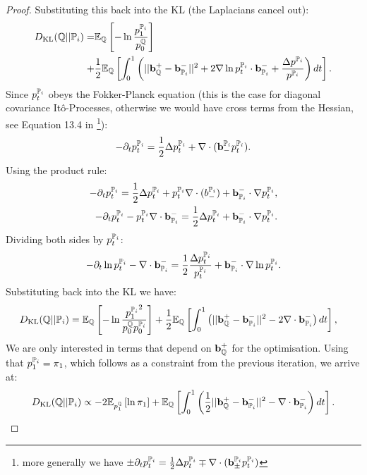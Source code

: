 \documentclass[a4paper,12pt,twoside,openright]{report}
\theoremstyle{definition}
\begin{document}
\begin{proof}
Substituting this back into the KL (the Laplacians cancel out):
\begin{align*}
\KL(\Q||{\P_{i}}) = &\E_\Q\left[-\log \frac{ p^{\P_{i}}_1}{ p^\Q_0}\right] \\+ &\frac{1}{2}\E_{\Q}\left[\int_0^1 \left(|| \rvb_\Q^{+} - \rvb_{\P_{i}}^{-}||^2 + 2\nabla\log p_t^{\P_{i}} \cdot \rvb_{\P_{i}}^{-}+ \frac{\Delta  p^{\P_{i}}}{ p^{\P_{i}}}\right)dt\right].
\end{align*}
Since $ p_t^{\P_{i}}$ obeys the Fokker-Planck equation (this is the case for diagonal covariance Itô-Processes, otherwise we would have cross terms from the Hessian, see Equation 13.4 in \cite{nelson1967dynamical}\footnote{more generally we have $\pm\partial_t p_t^{\P_{i}} = \frac{1}{2}\Delta p_t^{\P_{i}}\mp\nabla\cdot(\rvb_\pm^{\P_{i}} p_t^{\P_{i}})$}): 
\begin{align*}
-\partial_t p_t^{\P_{i}} = \frac{1}{2}\Delta p_t^{\P_{i}}+\nabla\cdot(\rvb_{-}^{\P_{i}} p_t^{\P_{i}}).
\end{align*}
Using the product rule: 
\begin{align*}
-\partial_t p_t^{\P_{i}} = \frac{1}{2}\Delta p_t^{\P_{i}}+  p_t^{\P_{i}} \nabla\cdot(b_{-}^{\P_{i}}) + \rvb^{-}_{\P_{i}} \cdot \nabla p_t^{\P_{i}}, \\
-\partial_t p_t^{\P_{i}} -  p_t^{\P_{i}} \nabla\cdot \rvb^{-}_{\P_{i}}  = \frac{1}{2}\Delta p_t^{\P_{i}}+ \rvb^{-}_{\P_{i}} \cdot\nabla  p_t^{\P_{i}}.
\end{align*}
Dividing both sides by $ p_t^{\P_{i}}$:
\begin{align*}
-\partial_t \log  p_t^{\P_{i}} - \nabla\cdot \rvb^{-}_{\P_{i}}  = \frac{1}{2}\frac{\Delta  p_t^{\P_{i}}}{ p_t^{\P_{i}}}+  \rvb^{-}_{\P_{i}} \cdot \nabla \log  p_t^{\P_{i}}.
\end{align*}
Substituting back into the KL we have:
\begin{align*}
\KL(\Q||{\P_{i}}) &= \E_\Q\left[-\log \frac{{ p^{\P_{i}}_1}^2}{ p^\Q_0  p_0^{{\P_{i}}}}\right] + \frac{1}{2}\E_{\Q}\left[\int_0^1 \left(|| \rvb_\Q^{+} - \rvb_{\P_{i}}^{-}||^2 - 2\nabla\cdot \rvb^{-}_{\P_{i}} \right)dt\right], %
\end{align*}
We are only interested in terms that depend on $\rvb^{+}_\Q$ for the optimisation. Using that $p^{\P_{i}}_1=\pi_1$, which follows as a constraint from the previous iteration, we arrive at:
\begin{align}
\KL(\Q||{\P_{i}}) \propto -2\E_{ p^\Q_1}\left[\log {{ \pi_1 }} \right] + \E_{\Q}\left[\int_0^1 \left(\frac{1}{2}|| \rvb_\Q^{+} - \rvb_{\P_{i}}^{-}||^2 - \nabla\cdot \rvb^{-}_{\P_{i}} \right)dt\right].
\end{align}
\end{proof}
\end{document}
